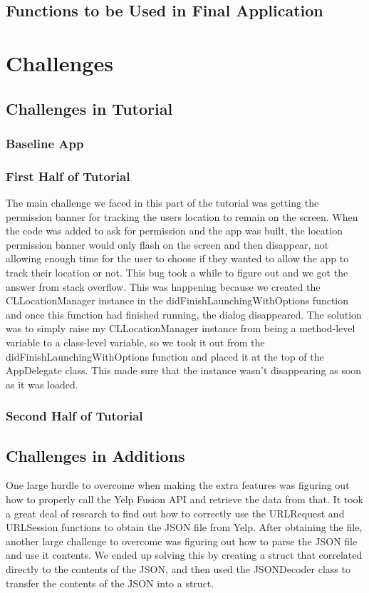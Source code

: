 \documentclass[conference]{IEEEtran}
\begin{document}
\subsection{Functions to be Used in Final Application}

\section{Challenges}

\subsection{Challenges in Tutorial}

\subsubsection{Baseline App}

\subsubsection{First Half of Tutorial}
The main challenge we faced in this part of the tutorial was getting the permission 
banner for tracking the users location to remain on the screen. When the code was 
added to ask for permission and the app was built, the location permission banner 
would only flash on the screen and then disappear, not allowing enough time for the 
user to choose if they wanted to allow the app to track their location or not. This bug 
took a while to figure out and we got the answer from stack overflow. This was happening 
because we created the CLLocationManager instance in the didFinishLaunchingWithOptions 
function and once this function had finished running, the dialog disappeared. The solution 
was to simply raise my CLLocationManager instance from being a method-level variable to a 
class-level variable, so we took it out from the didFinishLaunchingWithOptions function and 
placed it at the top of the AppDelegate class. This made sure that the instance wasn't 
disappearing as soon as it was loaded. 
\subsubsection{Second Half of Tutorial}


\subsection{Challenges in Additions}
One large hurdle to overcome when making the extra features was figuring out how
to properly call the Yelp Fusion API and retrieve the data from that. It took a 
great deal of research to find out how to correctly use the URLRequest and URLSession
functions to obtain the JSON file from Yelp. After obtaining the file, another large
challenge to overcome was figuring out how to parse the JSON file and use it contents.
We ended up solving this by creating a struct that correlated directly to the contents
of the JSON, and then used the JSONDecoder class to transfer the contents of the 
JSON into a struct.
\end{document}
